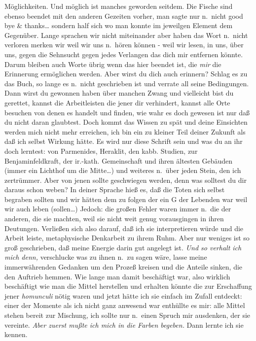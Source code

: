 \documentclass[
]{article}
\begin{document}
Möglichkeiten. Und möglich ist manches geworden seitdem. Die Fische sind
ebenso beendet mit den anderen Gezeiten vorher, man sagte nur n.~nicht
good bye \& thanks\ldots{} sondern half sich wo man konnte im jeweilgen
Element dem Gegenüber. Lange sprachen wir nicht miteinander aber haben
das Wort n.~nicht verloren merken wir weil wir uns n.~hören können -
weil wir lesen, in uns, über uns, gegen die Sehnsucht gegen jedes
Verlangen das dich mir entfernen könnte. Darum bleiben auch Worte übrig
wenn das hier beendet ist, die \emph{mir} die Erinnerung ermöglichen
werden. Aber wirst du dich auch erinnern? Schlag es zu das Buch, so
lange es n.~nicht geschrieben ist und verrate all seine Bedingungen.
Dann wirst du gewonnen haben über manchen Zwang und vielleicht bist du
gerettet, kannst die Arbeitleisten die jener dir verhindert, kannst alle
Orte besuchen von denen es handelt und finden, wie wahr es doch gewesen
ist nur daß du nicht daran glaubtest. Doch kommt das Wissen zu spät und
deine Einsichten werden mich nicht mehr erreichen, ich bin ein zu
kleiner Teil deiner Zukunft als daß ich selbst Wirkung hätte. Es wird
nur diese Schrift sein und was du an ihr doch lerntest: von Parmenides,
Heraklit, den kabb. Studien, zur Benjaminfeldkraft, der ir.-kath.
Gemeinschaft und ihren ältesten Gebäuden (immer ein Lichthof um die
Mitte\ldots) und weiteres n.~über jeden Stein, den ich zertrümmer. Aber
von jenen sollte geschwiegen werden, denn was solltest du dir daraus
schon weben? In deiner Sprache hieß es, daß die Toten sich selbst
begraben sollten und wir hätten dem zu folgen der ein G der Lebenden war
weil wir auch leben (sollen\ldots) Jedoch: die großen Fehler waren immer
n.~die der anderen, die sie machten, weil sie nicht weit genug
vorausgingen in ihren Deutungen. Verließen sich also darauf, daß ich sie
interpretieren würde und die Arbeit leiste, metaphysische Denkarbeit zu
ihrem Ruhm. Aber nur weniges ist so groß geschrieben, daß meine Energie
darin gut angelegt ist. \emph{Und so verhalt ich mich denn,} verschlucke
was zu ihnen n.~zu sagen wäre, lasse meine immerwährenden Gedanken um
den Prozeß kreisen und die Anteile sinken, die den Auftrieb hemmen. Wie
lange man damit beschäftigt war, also wirklich beschäftigt wie man die
Mittel herstellen und erhalten könnte die zur Erschaffung jener
\emph{homunculi} nötig waren und jetzt hätte ich sie einfach im Zufall
entdeckt: einer der Momente als ich nicht ganz anwesend war enthüllte es
mir: alle Mittel stehen bereit zur Mischung, ich sollte nur n.~einen
Spruch mir ausdenken, der sie vereinte. \emph{Aber zuerst mußte ich mich
in die Farben begeben. }Dann lernte ich sie kennen.
\end{document}
